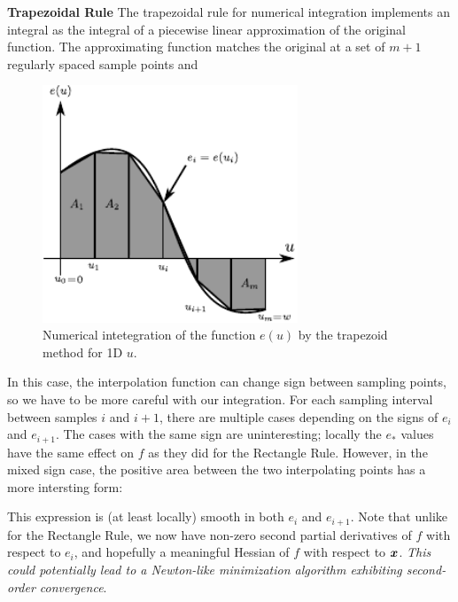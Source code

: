 
{\bf Trapezoidal Rule}  The trapezoidal rule for numerical integration
implements an integral as the integral of a piecewise linear approximation of
the original function.  The approximating function matches the original at a
set of $m+1$ regularly spaced sample points and 

\begin{figure}[htb]
 \centering
 \includegraphics[width=3in]{figures_subgradient/integration_trapezoid.pdf}
 \caption{Numerical intetegration of the function $e(u)$ by the trapezoid method for 1D $u$.}
 \label{fig:trapezoid}
\end{figure}


In this case, the interpolation function can change sign between sampling
points, so we have to be more careful with our integration.  For each sampling
interval between samples $i$ and $i+1$, there are multiple cases depending on
the signs of $e_i$ and $e_{i+1}$.  The cases with the same sign are
uninteresting; locally the $e_*$ values have the same effect on $f$ as they did
for the Rectangle Rule.  However, in the mixed sign case, the positive area
between the two interpolating points has a more intersting form:



This expression is (at least locally) smooth in both $e_i$ and $e_{i+1}$.  Note
that unlike for the Rectangle Rule, we now have non-zero second partial
derivatives of $f$ with respect to $e_i$, and hopefully a meaningful Hessian of
$f$ with respect to ${\boldsymbol{x}}$.  {\em This could potentially lead to a Newton-like
minimization algorithm exhibiting second-order convergence}.  

